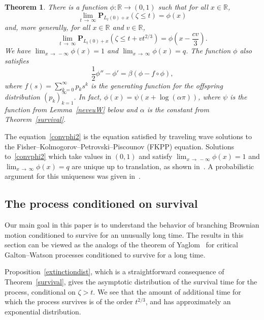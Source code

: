 \documentclass[10pt]{amsart}
\newtheorem{theo}{Theorem}[section]
\theoremstyle{definition}\newtheorem{defi}[theo]{Definition}\newtheorem{rema}[theo]{Remark}\newtheorem{exam}[theo]{Example}\newtheorem{exem}[theo]{Example}\newtheorem{nota}[theo]{Notation}
\renewcommand*\P{\mathbf{P}}
\newcommand*\R{\mathbb{R}}
\newcommand{\1} {\mathds{1}}
\begin{document}
\begin{theo}\label{survivex}
There is a function $\phi: \R \rightarrow (0,1)$ such that for all $x \in \R$,
\begin{equation}\label{convphi}
\lim_{t\,\rightarrow\,\infty} \P_{L_t(0) + x}(\zeta \leq t) = \phi(x)
\end{equation}
and, more generally, for all $x \in \R$ and $v \in \R$,
\begin{equation}\label{convphi2}
\lim_{t\,\rightarrow\,\infty} \P_{L_t(0)+x}\left(\zeta \leq t + vt^{2/3}\right) = \phi\left(x - \frac{cv}{3}\right).
\end{equation}
We have $\lim_{x\,\rightarrow\,-\infty} \phi(x) = 1$ and $\lim_{x\,\rightarrow\,\infty} \phi(x) = q$. The function $\phi$ also satisfies
\begin{equation}\label{FKPPwave}
\frac{1}{2} \phi'' - \phi' = \beta\left(\phi - f \circ \phi\right),
\end{equation}
where $f(s) = \sum_{k=0}^{\infty} p_k s^k$ is the generating function for the offspring distribution $(p_k)_{k=1}^{\infty}$. In fact, $\phi(x) = \psi(x+\log(\alpha\pi))$, where $\psi$ is the function from Lemma~\ref{neveuW} below and $\alpha$ is the constant from Theorem~\ref{survival}.
\end{theo}

The equation~\eqref{convphi2} is the equation satisfied by traveling wave solutions to the Fi\-sher--Kolmogorov--Petrovski--Piscounov (FKPP) equation. Solutions to~\eqref{convphi2} which take values in $(0,1)$ and satisfy $\lim_{x\,\rightarrow\,-\infty} \phi(x) = 1$ and $\lim_{x\,\rightarrow\,\infty} \phi(x) = q$ are unique up to translation, as shown in~\cite{kpp}. A probabilistic argument for this uniqueness was given in~\cite{kyp04}.


\subsection{The process conditioned on survival}
Our main goal in this paper is to understand the behavior of branching Brownian motion conditioned to survive for an unusually long time. The results in this section can be viewed as the analogs of the theorem of Yaglom~\cite{yaglom} for critical Galton--Watson processes conditioned to survive for a long time.

Proposition~\ref{extinctiondist}, which is a straightforward consequence of Theorem~\ref{survival}, gives the asymptotic distribution of the survival time for the process, conditional on $\zeta > t$. We see that the amount of additional time for which the process survives is of the order $t^{2/3}$, and has approximately an exponential distribution.
\end{document}
